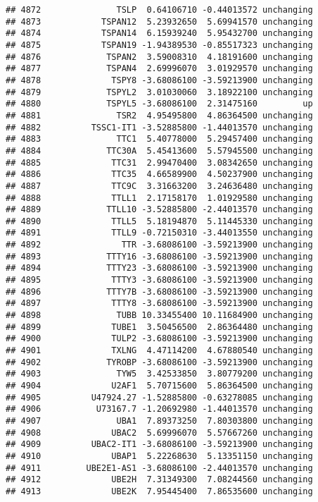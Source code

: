 \documentclass[]{article}
\begin{document}
\begin{verbatim}
## 4872               TSLP  0.64106710 -0.44013572 unchanging
## 4873            TSPAN12  5.23932650  5.69941570 unchanging
## 4874            TSPAN14  6.15939240  5.95432700 unchanging
## 4875            TSPAN19 -1.94389530 -0.85517323 unchanging
## 4876             TSPAN2  3.59008310  4.18191600 unchanging
## 4877             TSPAN4  2.69996070  3.01929570 unchanging
## 4878              TSPY8 -3.68086100 -3.59213900 unchanging
## 4879             TSPYL2  3.01030060  3.18922100 unchanging
## 4880             TSPYL5 -3.68086100  2.31475160         up
## 4881               TSR2  4.95495800  4.86364500 unchanging
## 4882          TSSC1-IT1 -3.52885800 -1.44013570 unchanging
## 4883               TTC1  5.40778000  5.29457400 unchanging
## 4884             TTC30A  5.45413600  5.57945500 unchanging
## 4885              TTC31  2.99470400  3.08342650 unchanging
## 4886              TTC35  4.66589900  4.50237900 unchanging
## 4887              TTC9C  3.31663200  3.24636480 unchanging
## 4888              TTLL1  2.17158170  1.01929580 unchanging
## 4889             TTLL10 -3.52885800 -2.44013570 unchanging
## 4890              TTLL5  5.18194870  5.11445330 unchanging
## 4891              TTLL9 -0.72150310 -3.44013550 unchanging
## 4892                TTR -3.68086100 -3.59213900 unchanging
## 4893             TTTY16 -3.68086100 -3.59213900 unchanging
## 4894             TTTY23 -3.68086100 -3.59213900 unchanging
## 4895              TTTY3 -3.68086100 -3.59213900 unchanging
## 4896             TTTY7B -3.68086100 -3.59213900 unchanging
## 4897              TTTY8 -3.68086100 -3.59213900 unchanging
## 4898               TUBB 10.33455400 10.11684900 unchanging
## 4899              TUBE1  3.50456500  2.86364480 unchanging
## 4900              TULP2 -3.68086100 -3.59213900 unchanging
## 4901              TXLNG  4.47114200  4.67880540 unchanging
## 4902             TYROBP -3.68086100 -3.59213900 unchanging
## 4903               TYW5  3.42533850  3.80779200 unchanging
## 4904              U2AF1  5.70715600  5.86364500 unchanging
## 4905          U47924.27 -1.52885800 -0.63278085 unchanging
## 4906           U73167.7 -1.20692980 -1.44013570 unchanging
## 4907               UBA1  7.89373250  7.80303800 unchanging
## 4908              UBAC2  5.69996070  5.57667260 unchanging
## 4909          UBAC2-IT1 -3.68086100 -3.59213900 unchanging
## 4910              UBAP1  5.22268630  5.13351150 unchanging
## 4911         UBE2E1-AS1 -3.68086100 -2.44013570 unchanging
## 4912              UBE2H  7.31349300  7.08244560 unchanging
## 4913              UBE2K  7.95445400  7.86535600 unchanging

\end{verbatim}
\end{document}
